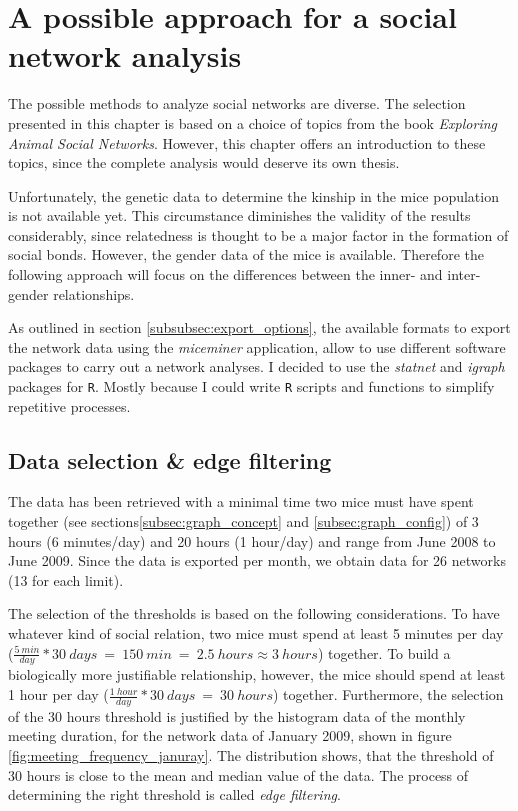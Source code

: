 \section{A possible approach for a social network analysis}
\label{sec:network_analysis}

The possible methods to analyze social networks are diverse. The selection presented in this chapter is based on a choice of topics from the book \textit{Exploring Animal Social Networks}\cite{croft:07}. However, this chapter offers an introduction to these topics, since the complete analysis would deserve its own thesis. 

Unfortunately, the genetic data to determine the kinship in the mice population is not available yet. This circumstance diminishes the validity of the results considerably, since relatedness is thought to be a major factor in the formation of social bonds. However, the gender data of the mice is available. Therefore the following approach will focus on the differences between the inner- and inter-gender relationships.

As outlined in section \ref{subsubsec:export_options}, the available formats to export the network data using the \textit{miceminer} application, allow to use different software packages to carry out a network analyses. I decided to use the \textit{statnet}\cite{statnet:03} and \textit{igraph}\cite{igraph:06} packages for \lstinline|R|\cite{r:05}. Mostly because I could write \lstinline|R| scripts and functions to simplify repetitive processes.

\subsection{Data selection \& edge filtering}
\label{subsec:data_selection}

The data has been retrieved with a minimal time two mice must have spent together (see sections\ref{subsec:graph_concept} and \ref{subsec:graph_config}) of 3 hours (6 minutes/day) and 20 hours (1 hour/day) and range from June 2008 to June 2009. Since the data is exported per month, we obtain data for 26 networks (13 for each limit).

The selection of the thresholds is based on the following considerations. To have whatever kind of social relation, two mice must spend at least 5 minutes per day ($\frac{5\:min}{day} * 30\:days\:=\:150\:min\:=\:2.5\:hours \approx 3\:hours$) together. To build a biologically more justifiable relationship, however, the mice should spend at least 1 hour per day ($\frac{1\:hour}{day} * 30\:days\:=\:30\:hours$) together.  Furthermore, the selection of the 30 hours threshold is justified by the histogram data of the monthly meeting duration, for the network data of January 2009, shown in figure \ref{fig:meeting_frequency_januray}. The distribution shows, that the threshold of 30 hours is close to the mean and median value of the data. The process of determining the right threshold is called \textit{edge filtering}.

